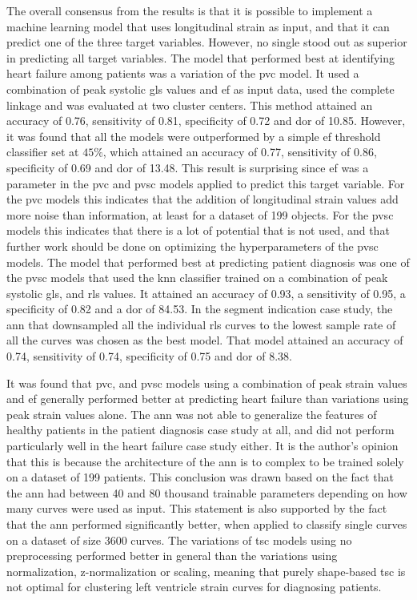 The overall consensus from the results is that it is possible to implement a machine learning model that uses longitudinal strain as input, and that it can predict one of the three target variables. However, no single stood out as superior in predicting all target variables. The model that performed best at identifying heart failure among patients was a variation of the \acrshort{pvc} model. It used a combination of peak systolic \acrshort{gls} values and \acrshort{ef} as input data, used the complete linkage and was evaluated at two cluster centers. This method attained an accuracy of 0.76, sensitivity of 0.81, specificity of 0.72 and \acrshort{dor} of 10.85. However, it was found that all the models were outperformed by a simple \acrshort{ef} threshold classifier set at $45\%$, which attained an accuracy of 0.77, sensitivity of 0.86, specificity of 0.69 and \acrshort{dor} of 13.48. This result is surprising since \acrshort{ef} was a parameter in the \acrshort{pvc} and \acrshort{pvsc} models applied to predict this target variable. For the \acrshort{pvc} models this indicates that the addition of longitudinal strain values add more noise than information, at least for a dataset of 199 objects. For the \acrshort{pvsc} models this indicates that there is a lot of potential that is not used, and that further work should be done on optimizing the hyperparameters of the \acrshort{pvsc} models. The model that performed best at predicting patient diagnosis was one of the \acrshort{pvsc} models that used the \acrshort{knn} classifier trained on a combination of peak systolic \acrshort{gls}, and \acrshort{rls} values. It attained an accuracy of 0.93, a sensitivity of 0.95, a specificity of 0.82 and a \acrshort{dor} of 84.53. In the segment indication case study, the \acrshort{ann} that downsampled all the individual \acrshort{rls} curves to the lowest sample rate of all the curves was chosen as the best model. That model attained an accuracy of 0.74, sensitivity of 0.74, specificity of 0.75 and \acrshort{dor} of 8.38. \bigskip

It was found that \acrshort{pvc}, and \acrshort{pvsc} models using a combination of peak strain values and \acrshort{ef} generally performed better at predicting heart failure than variations using peak strain values alone. The \acrshort{ann} was not able to generalize the features of healthy patients in the patient diagnosis case study at all, and did not perform particularly well in the heart failure case study either. It is the author's opinion that this is because the architecture of the \acrshort{ann} is to complex to be trained solely on a dataset of 199 patients. This conclusion was drawn based on the fact that the \acrshort{ann} had between 40 and 80 thousand trainable parameters depending on how many curves were used as input. This statement is also supported by the fact that the \acrshort{ann} performed significantly better, when applied to classify single curves on a dataset of size 3600 curves. The variations of \acrshort{tsc} models using no preprocessing performed better in general than the variations using normalization, z-normalization or scaling, meaning that purely shape-based \acrshort{tsc} is not optimal for clustering left ventricle strain curves for diagnosing patients.

